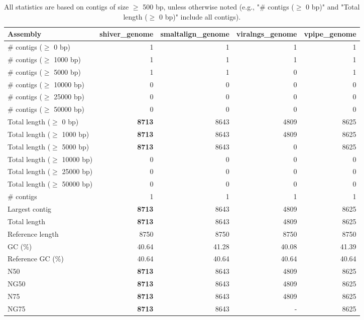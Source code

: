 \documentclass[12pt,a4paper]{article}
\begin{document}
\begin{table}[ht]
\begin{center}
\caption{All statistics are based on contigs of size $\geq$ 500 bp, unless otherwise noted (e.g., "\# contigs ($\geq$ 0 bp)" and "Total length ($\geq$ 0 bp)" include all contigs).}
\begin{tabular}{|l*{4}{|r}|}
\hline
Assembly & shiver\_genome & smaltalign\_genome & viralngs\_genome & vpipe\_genome \\ \hline
\# contigs ($\geq$ 0 bp) & 1 & 1 & 1 & 1 \\ \hline
\# contigs ($\geq$ 1000 bp) & 1 & 1 & 1 & 1 \\ \hline
\# contigs ($\geq$ 5000 bp) & 1 & 1 & 0 & 1 \\ \hline
\# contigs ($\geq$ 10000 bp) & 0 & 0 & 0 & 0 \\ \hline
\# contigs ($\geq$ 25000 bp) & 0 & 0 & 0 & 0 \\ \hline
\# contigs ($\geq$ 50000 bp) & 0 & 0 & 0 & 0 \\ \hline
Total length ($\geq$ 0 bp) & {\bf 8713} & 8643 & 4809 & 8625 \\ \hline
Total length ($\geq$ 1000 bp) & {\bf 8713} & 8643 & 4809 & 8625 \\ \hline
Total length ($\geq$ 5000 bp) & {\bf 8713} & 8643 & 0 & 8625 \\ \hline
Total length ($\geq$ 10000 bp) & 0 & 0 & 0 & 0 \\ \hline
Total length ($\geq$ 25000 bp) & 0 & 0 & 0 & 0 \\ \hline
Total length ($\geq$ 50000 bp) & 0 & 0 & 0 & 0 \\ \hline
\# contigs & 1 & 1 & 1 & 1 \\ \hline
Largest contig & {\bf 8713} & 8643 & 4809 & 8625 \\ \hline
Total length & {\bf 8713} & 8643 & 4809 & 8625 \\ \hline
Reference length & 8750 & 8750 & 8750 & 8750 \\ \hline
GC (\%) & 40.64 & 41.28 & 40.08 & 41.39 \\ \hline
Reference GC (\%) & 40.64 & 40.64 & 40.64 & 40.64 \\ \hline
N50 & {\bf 8713} & 8643 & 4809 & 8625 \\ \hline
NG50 & {\bf 8713} & 8643 & 4809 & 8625 \\ \hline
N75 & {\bf 8713} & 8643 & 4809 & 8625 \\ \hline
NG75 & {\bf 8713} & 8643 & - & 8625 \\ \hline

\end{tabular}
\end{center}
\end{table}
\end{document}
